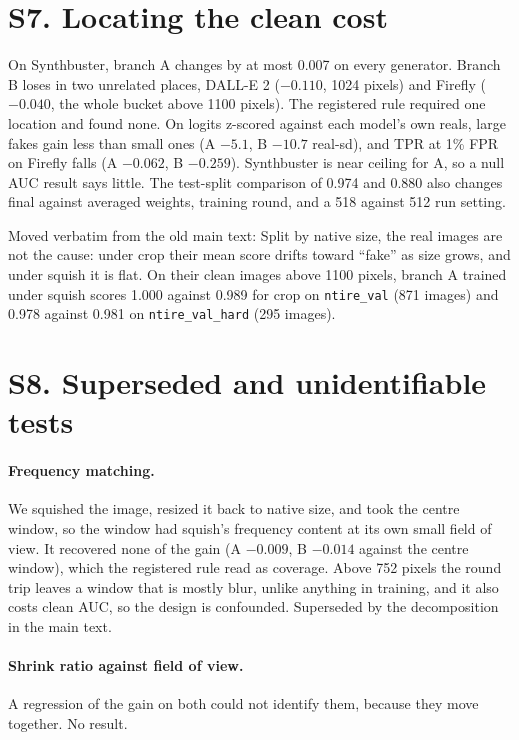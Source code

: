 \documentclass[10pt]{article}
\begin{document}
\section*{S7. Locating the clean cost}

On Synthbuster, branch A changes by at most 0.007 on every generator. Branch
B loses in two unrelated places, DALL-E 2 ($-0.110$, 1024 pixels) and Firefly
($-0.040$, the whole bucket above 1100 pixels). The registered rule required
one location and found none. On logits z-scored against each model's own
reals, large fakes gain less than small ones (A $-5.1$, B $-10.7$ real-sd),
and TPR at 1\% FPR on Firefly falls (A $-0.062$, B $-0.259$). Synthbuster is
near ceiling for A, so a null AUC result says little. The test-split
comparison of 0.974 and 0.880 also changes final against averaged weights,
training round, and a 518 against 512 run setting.

Moved verbatim from the old main text: Split by native size, the real images
are not the cause: under crop their mean score drifts toward ``fake'' as size
grows, and under squish it is flat. On their clean images above 1100 pixels,
branch A trained under squish scores 1.000 against 0.989 for crop on
\texttt{ntire\_val} (871 images) and 0.978 against 0.981 on
\texttt{ntire\_val\_hard} (295 images).

\section*{S8. Superseded and unidentifiable tests}

\paragraph{Frequency matching.} We squished the image, resized it
back to native size, and took the centre window, so the window had squish's
frequency content at its own small field of view. It recovered none of the
gain (A $-0.009$, B $-0.014$ against the centre window), which the registered
rule read as coverage. Above 752 pixels the round trip leaves a window that
is mostly blur, unlike anything in training, and it also costs clean AUC, so
the design is confounded. Superseded by the decomposition in the main text.

\paragraph{Shrink ratio against field of view.} A regression of the
gain on both could not identify them, because they move together. No result.
\end{document}
